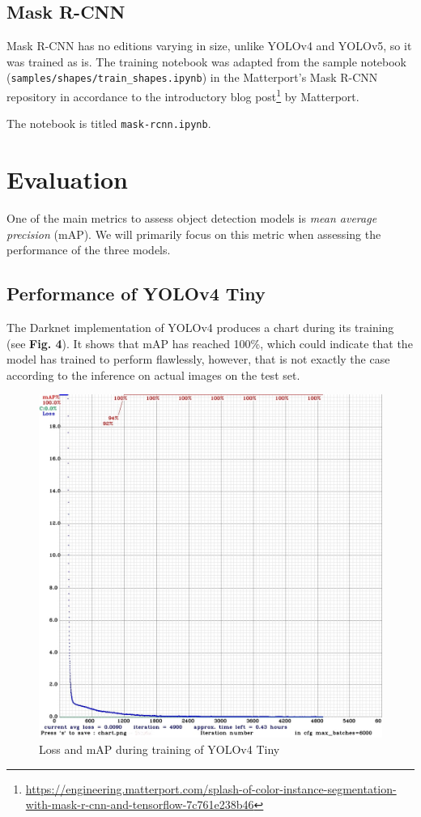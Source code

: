 \documentclass[journal,onecolumn]{IEEEtran}
\begin{document}
\subsection{Mask R-CNN}

Mask R-CNN has no editions varying in size, unlike YOLOv4 and YOLOv5, so it was trained as is. The training notebook was adapted from the sample notebook (\texttt{samples/shapes/train\_shapes.ipynb}) in the Matterport's Mask R-CNN repository in accordance to the introductory blog post\footnote{\href{https://engineering.matterport.com/splash-of-color-instance-segmentation-with-mask-r-cnn-and-tensorflow-7c761e238b46}{https://engineering.matterport.com/splash-of-color-instance-segmentation-with-mask-r-cnn-and-tensorflow-7c761e238b46}} by Matterport.

The notebook is titled \texttt{mask-rcnn.ipynb}.

\section{Evaluation}

One of the main metrics to assess object detection models is \emph{mean average precision} (mAP). We will primarily focus on this metric when assessing the performance of the three models.

\subsection{Performance of YOLOv4 Tiny}

The Darknet implementation of YOLOv4 produces a chart during its training (see \textbf{Fig. 4}). It shows that mAP has reached 100\%, which could indicate that the model has trained to perform flawlessly, however, that is not exactly the case according to the inference on actual images on the test set.

\begin{figure}
    \centering
    \includegraphics[width=0.475\linewidth]{figures/chart-yolov4.jpg}
    \caption{Loss and mAP during training of YOLOv4 Tiny}
\end{figure}
\end{document}

